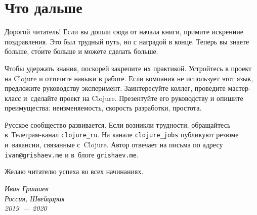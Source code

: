 \chapter{Что дальше}

Дорогой читатель! Если вы дошли сюда от начала книги, примите искренние
поздравления. Это был трудный путь, но с наградой в конце. Теперь вы знаете
больше, ст\'{о}ите больше и можете сделать больше.

Чтобы удержать знания, поскорей закрепите их практикой. Устройтесь в проект на
Clojure и отточите навыки в работе. Если компания не использует этот язык,
предложите руководству эксперимент. Заинтересуйте коллег, проведите мастер-класс
и~сделайте проект на Clojure. Презентуйте его руководству и опишите
преимущества: неизменяемость, скорость разработки, простота.

Русское сообщество развивается. Если возникли трудности, обращайтесь
в~Телеграм-канал \verb|clojure_ru|. На канале \verb|clojure_jobs| публикуют
резюме и~вакансии, связанные с~Clojure. Автор отвечает на письма по адресу
\verb|ivan@grishaev.me| и в~блоге \verb|grishaev.me|.

Желаю читателю успеха во всех начинаниях.

\vspace{1em}

\noindent
\textit{Иван Гришаев\\Россия, Швейцария\\2019~--- 2020}
